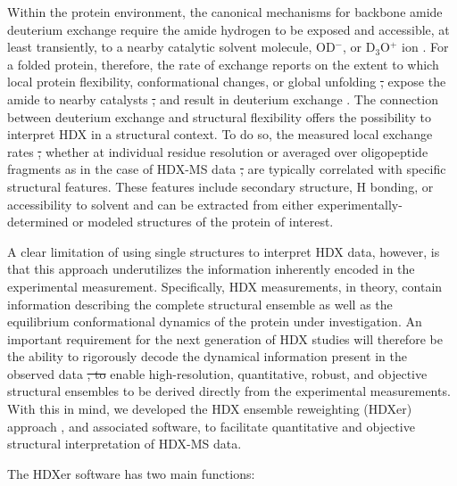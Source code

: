 \documentclass[9pt,tutorial]{livecoms}
\providecommand{\DIFadd}[1]{{\protect\color{blue}\uwave{#1}}} %
\providecommand{\DIFdel}[1]{{\protect\color{red}\sout{#1}}}                      %
\providecommand{\DIFaddbegin}{} %
\providecommand{\DIFaddend}{} %
\providecommand{\DIFdelbegin}{} %
\providecommand{\DIFdelend}{} %
\begin{document}
Within the protein environment, the canonical mechanisms for backbone amide deuterium exchange require the amide hydrogen to be exposed and accessible, at least transiently, to \DIFaddbegin \DIFadd{either }\DIFaddend a nearby catalytic solvent molecule, OD$^-$, or D$_3$O$^+$ ion \cite{Hvidt1966, Englander1983}. 
For a folded protein, therefore, the rate of exchange reports on the extent to which local protein flexibility, conformational changes, or global unfolding \DIFdelbegin \DIFdel{, }\DIFdelend expose the amide to nearby catalysts \DIFdelbegin \DIFdel{, }\DIFdelend and result in deuterium exchange \cite{Hvidt1966, Englander1997, Englander1983, Oganesyan2018}.
The connection between deuterium exchange and structural flexibility offers the possibility to interpret HDX in a structural context.
To do so, the measured local exchange rates \DIFdelbegin \DIFdel{, }\DIFdelend \DIFaddbegin \DIFadd{-- }\DIFaddend whether at individual residue resolution or averaged over oligopeptide fragments as in the case of HDX-MS data \DIFdelbegin \DIFdel{, }\DIFdelend \DIFaddbegin \DIFadd{-- }\DIFaddend are typically correlated with specific structural features. 
These features include secondary structure, H bonding, or accessibility to solvent and can be extracted from either experimentally-determined or modeled structures of the protein of interest.

A clear limitation of using single structures to interpret HDX data, however, is that this approach underutilizes the information inherently encoded in the experimental measurement.
Specifically, HDX measurements, in theory, contain information describing the complete structural ensemble as well as the equilibrium conformational dynamics of the protein under investigation.
An important requirement for the next generation of HDX studies will therefore be the ability to rigorously decode the dynamical information present in the observed data \DIFdelbegin \DIFdel{, to }\DIFdelend \DIFaddbegin \DIFadd{and }\DIFaddend enable high-resolution, quantitative, robust, and objective structural ensembles to be derived directly from the experimental measurements.
With this in mind, we developed the HDX ensemble reweighting (HDXer) approach \cite{Bradshaw2020}, and associated software, to facilitate quantitative and objective structural interpretation of HDX-MS data.

The HDXer software has two main functions:
\end{document}
